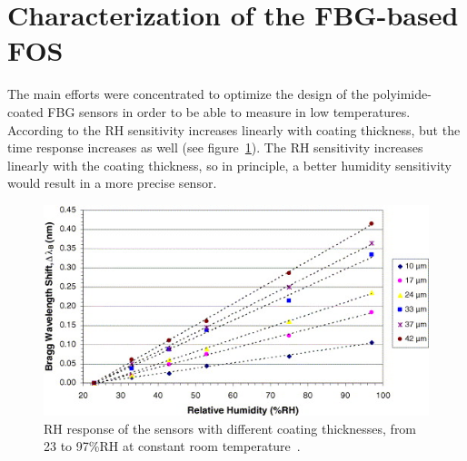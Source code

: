 \section{Characterization of the FBG-based FOS}
The main efforts were concentrated to optimize the design of the polyimide-coated FBG sensors in order to be able to measure in low temperatures. According to \cite{YEO_PI} the \gls{RH} sensitivity increases linearly with coating thickness, but the time response increases as well (see figure~\ref{fig:yeo}). The \gls{RH} sensitivity increases linearly with the coating thickness, so in principle, a better humidity sensitivity would result in a more precise sensor.

\begin{figure}[!h]
\centering
\includegraphics[width=0.80\columnwidth]{Chapter5/images/yeo_coating.jpg}
\caption{RH response of the sensors with different coating thicknesses, from 23 to 97\%RH at constant room temperature~\cite{YEO_PI}.}
\label{fig:yeo}
\end{figure}

